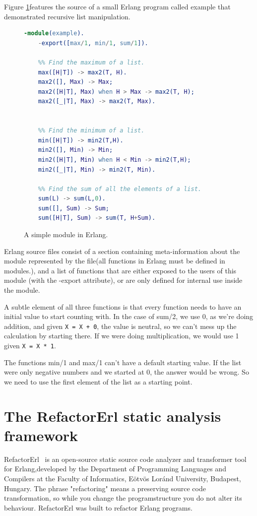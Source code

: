 Figure \ref{fig:example_erlang}features the source of a small Erlang program
called example that demonstrated recursive list manipulation.
\begin{figure}[h]
	\begin{lstlisting}[extendedchars=true, language=Erlang, basicstyle=\footnotesize\ttfamily, keywordstyle=\color{red}]
	-module(example). 
	-export([max/1, min/1, sum/1]).
	
	%% Find the maximum of a list.
	max([H|T]) -> max2(T, H).
	max2([], Max) -> Max;
	max2([H|T], Max) when H > Max -> max2(T, H);
	max2([_|T], Max) -> max2(T, Max).
	

	%% Find the minimum of a list.
	min([H|T]) -> min2(T,H).
	min2([], Min) -> Min;
	min2([H|T], Min) when H < Min -> min2(T,H);
	min2([_|T], Min) -> min2(T, Min).
	
	%% Find the sum of all the elements of a list.
	sum(L) -> sum(L,0).
	sum([], Sum) -> Sum;
	sum([H|T], Sum) -> sum(T, H+Sum).
	\end{lstlisting}
\caption{A simple module in Erlang.}
\label{fig:example_erlang}
\end{figure}

Erlang source files consist of a section containing meta-information about the module represented by the file(all functions in Erlang must be defined in
modules.), and a list of functions that are either exposed to the users of this module (with the -export attribute), or are only defined for internal use inside the module.  

A subtle element of all three functions is that every function needs to 
have an initial value to start counting with. In the case of 
sum/2, we use 0, as we’re doing addition, and given \texttt{X = X + 0}, the value is neutral, so we can’t mess up the calculation by starting there. If we were doing multiplication, we would use 1 given \texttt{X = X * 1}. 

The functions min/1 and max/1 can’t have a default starting value. If the 
list were only negative numbers and we started at 0, the answer would be 
wrong. So we need to use the first element of the list as a starting point.

\section{The RefactorErl static analysis framework} 

RefactorErl~\cite{refactorerl1, refactorerl2} is an open-source static source code analyzer and transformer tool for Erlang,developed by the Department of Programming Languages and Compilers at the Faculty of Informatics, Eötvös Loránd University, Budapest, Hungary. The phrase "refactoring" means a preserving source code transformation, so while you change the programstructure you do not alter its behaviour. RefactorErl was built to refactor Erlang programs.

